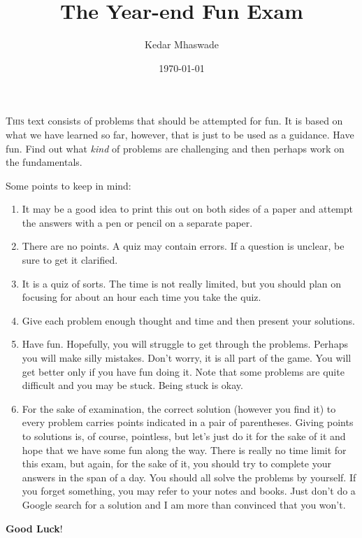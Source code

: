 \documentclass[12pt]{exam}         %
\title{The Year-end Fun Exam}
\author{Kedar Mhaswade}
\date{\today}
\begin{document}
\maketitle

\lettrine[lines=3]{T}{his} text consists of problems that should be attempted for fun. It is based on what we have learned so far, however, that is just to be used as a guidance. Have fun. Find out what \emph{kind} of problems
are challenging and then perhaps work on the fundamentals.

Some points to keep in mind:
\begin{enumerate}
\item It may be a good idea to print this out on both sides of a paper and attempt the answers with a pen or pencil on a separate paper.
\item There are no points. A quiz may contain errors. If a question is unclear, be sure to get it clarified.
\item It is a quiz of sorts. The time is not really limited, but you should plan on focusing for about an hour each time you take the quiz.
\item Give each problem enough thought and time and then present your solutions.
\item Have fun. Hopefully, you will struggle to get through the problems. Perhaps you will make silly mistakes. Don't worry, it is all part of the game. You will get better only if you have fun doing it. Note that some problems are quite difficult and you may be stuck. Being stuck is okay.
\item For the sake of examination, the correct solution (however you find it) to every problem carries points indicated in a pair of parentheses. Giving points to solutions is, of course, pointless, but let's just do it for the sake of it and hope that we have some fun along the way. There is really no time limit for this exam, but again, for the sake of it, you should try to complete your answers in the span of a day. You should all solve the problems by yourself. If you forget something, you may refer to your notes and books. Just don't do a Google search for a solution and I am more than convinced that you won't.
\end{enumerate}
\textbf{Good Luck}!

\newcommand\Prob[2]{%
   \leavevmode\par
   \stepcounter{question}
   \noindent
   Problem \thequestion \space (#2 points) -- #1 \par}
\end{document}

